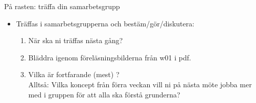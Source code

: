 \begin{Slide}{På rasten: träffa din samarbetsgrupp}
\begin{itemize}

\item Träffas i samarbetsgrupperna och bestäm/gör/diskutera:
\begin{enumerate}
\item När ska ni träffas nästa gång?
\item Bläddra igenom föreläsningsbilderna från w01 i pdf.
\item Vilka  är fortfarande (mest) ? \\Alltså: Vilka koncept från förra veckan vill ni på nästa möte jobba mer med i gruppen för att alla ska förstå grunderna?
\end{enumerate}

\end{itemize}

\end{Slide}


